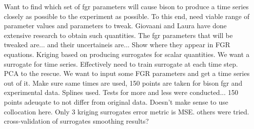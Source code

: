 Want to find which set of fgr parameters will cause bison to produce a time series closely as possible to the experiment as possible. To this end, need viable range of parameter values and parameters to tweak. Giovaani and Laura have done extensive research to obtain such quantities. The fgr parameters that will be tweaked are... and their uncertaineis are... Show where they appear in FGR equations. 
Kriging based on producing surrogates for scalar quantities. We want a surrogate for time series. Effectively need to train surrogate at each time step. PCA to the rescue. We want to input some FGR parameters and get a time series out of it. Make sure same times are used, 150 points are taken for bison fgr and experimental data. Splines used. Tests for more and less were conducted... 150 points adeuqate to not differ from original data.  
Doesn't make sense to use collocation here. 
Only 3 kriging surrogates
error metric is MSE. others were tried.
cross-validation of surrogates
smoothing results?
